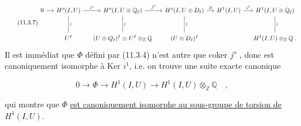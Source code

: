 \begin{equation}\tag{11.3.7}
\begin{tikzcd}[column sep=small, row sep=large]
0 \arrow[r] & H^o(I,U) \arrow[r, "i^o"] \arrow[d, dash, "\wr"] & H^o(I,U\otimes\mathbb{Q}_\ell) \arrow[r, "j^o"] \arrow[d, dash, "\wr"] & H^o(I,U\otimes D_\ell) \arrow[r, "\partial"] \arrow[d, dash, "\wr"] & H^1(I,U) \arrow[r, "i^1"] & H^1(I,U\otimes\mathbb{Q}_\ell) \arrow[d, dash, "\wr"] \\
{} & U^I & (U\otimes Q_\ell)^I \simeq U^I\otimes_{\mathbb{Z}}\mathbb{Q} & (U\otimes D_\ell)^I & {} & H^1(I,U)\otimes_{\mathbb{Z}}\mathbb{Q} \;.
\end{tikzcd}
\end{equation}
Il est immédiat que $\Phi$ défini par (11.3.4) n'est autre que coker $j^o$ , donc est canoniquement isomorphe à Ker $i^1$, i.e. on trouve une suite exacte canonique

\begin{equation}\tag{11.3.8}
0 \longrightarrow \Phi \longrightarrow H^1(I,U) \longrightarrow H^1(I,U)\otimes_{\mathbb{Z}}\mathbb{Q} \quad ,
\end{equation}


qui montre que $\Phi$ \underline{est canoniquement isomorphe au sous-groupe de torsion de} $H^1(I,U)$.

